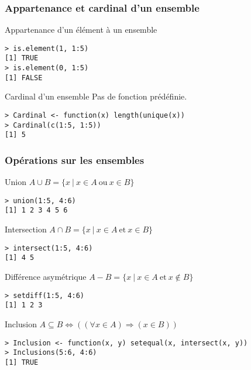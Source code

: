 \documentclass[10pt]{beamer}
\begin{document}
\begin{frame}[fragile]
  \frametitle{Appartenance et cardinal d'un ensemble}

  \begin{block}{Appartenance d'un élément à un ensemble}
    \begin{lstlisting}[style=block]
> is.element(1, 1:5)
[1] TRUE
> is.element(0, 1:5)
[1] FALSE
\end{lstlisting}
  \end{block}

  \begin{exampleblock}{Cardinal d'un ensemble}
    Pas de fonction prédéfinie.
    \begin{lstlisting}[style=block]
> Cardinal <- function(x) length(unique(x))
> Cardinal(c(1:5, 1:5))
[1] 5
\end{lstlisting}
\end{exampleblock}

\end{frame}


\begin{frame}[fragile]
  \frametitle{Opérations sur les ensembles}
  \begin{block}{Union $A \cup B = \{x\ |\ x \in A\ \mathrm{ou}\ x \in B\}$}
    \begin{lstlisting}[aboveskip = \bigskipamount]
> union(1:5, 4:6)
[1] 1 2 3 4 5 6
    \end{lstlisting}
  \end{block}

    \begin{block}{Intersection $A \cap B = \{x\ |\ x \in A\ \mathrm{et}\ x \in B\}$}
    \begin{lstlisting}[aboveskip = \bigskipamount]
> intersect(1:5, 4:6)
[1] 4 5
    \end{lstlisting}
  \end{block}

  \begin{block}{Différence asymétrique $A - B = \{x\ |\ x \in A\ \mathrm{et}\ x \notin B\}$}
    \begin{lstlisting}[aboveskip = \bigskipamount]
> setdiff(1:5, 4:6)
[1] 1 2 3
    \end{lstlisting}
  \end{block}

  \begin{exampleblock}{Inclusion $A \subseteq B \Leftrightarrow \left((\forall x \in A) \Rightarrow (x \in B)\right)$}
    \begin{lstlisting}[aboveskip = \bigskipamount]
> Inclusion <- function(x, y) setequal(x, intersect(x, y))
> Inclusions(5:6, 4:6)
[1] TRUE
    \end{lstlisting}
  \end{exampleblock}


\end{frame}
\end{document}
